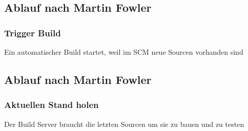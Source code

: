 \documentclass[hyperref={pdfpagelabels=false}]{beamer}
\begin{document}
\subsection{Ablauf nach Martin Fowler}
\begin{frame} [t]
\frametitle{Trigger Build}
\begin{figure}[h]
  \centering
\end{figure}
\vspace{0.5cm} 
Ein automatischer Build startet, weil im SCM neue Sourcen vorhanden sind
\end{frame}

\subsection{Ablauf nach Martin Fowler}
\begin{frame} [t]
\frametitle{Aktuellen Stand holen}
\begin{figure}[h]
  \centering
\end{figure}
\vspace{0.5cm} 
Der Build Server braucht die letzten Sourcen um sie zu bauen und zu testen
\end{frame}
\end{document}
